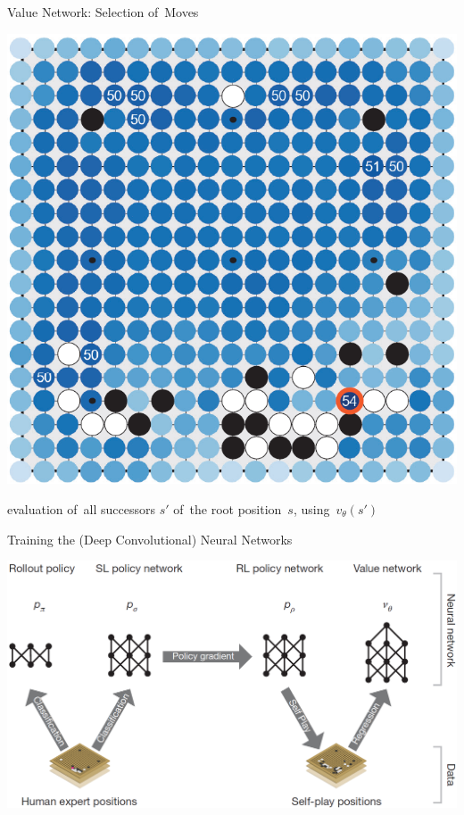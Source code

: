 \documentclass{beamer}
\begin{document}
{    \begin{frame}{Value Network: Selection of~Moves}
      \begin{center}
        \includegraphics[height=.8\textheight]{../img/move_selection_by_value_network.png}

        \tiny
        evaluation of~all successors $s'$ of~the root position~$s$, using~$v_\theta(s′)$
      \end{center}
    \end{frame}

    \begin{frame}{Training the (Deep Convolutional) Neural Networks}
      \begin{center}
        \includegraphics[width=\textwidth]{../img/neural_nets_pipeline.png}
      \end{center}
    \end{frame}

}
\end{document}
